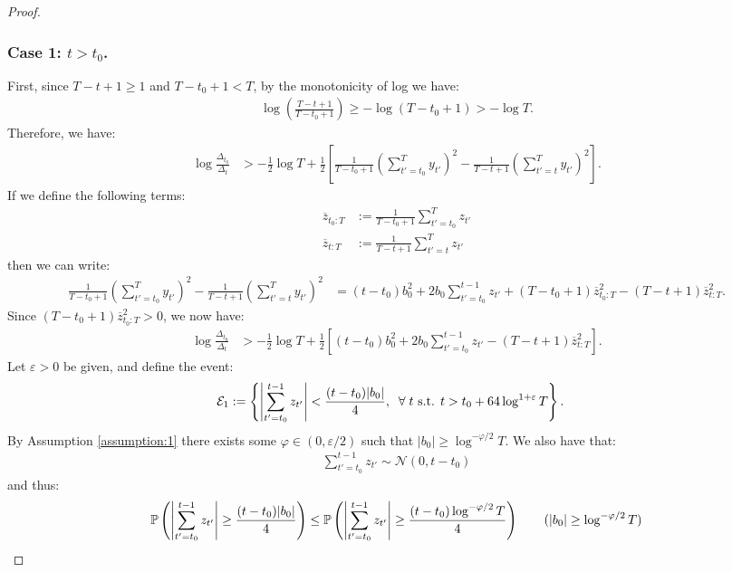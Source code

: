 \begin{proof}
\subsubsection*{Case 1: $t > t_0$.}

First, since $T-t +1\geq 1$ and $T-t_0+1 < T$, by the monotonicity of log we have: 
\begin{align*}
    \log \left(\frac{T-t+1}{T-t_0+1}\right) \geq -\log(T-t_0+1) > -\log T.
\end{align*}
Therefore, we have:
\begin{align*}
    \log \frac{\Delta_{t_0}}{\Delta_t} &> -\frac{1}{2} \log T + \frac{1}{2} \left[\frac{1}{T-t_0+1}\left(\sum_{t'=t_0}^{T} y_{t'}\right)^2- \frac{1}{T-t+1}\left(\sum_{t'=t}^{T} y_{t'}\right)^2\right]. 
\end{align*}
If we define the following terms:
\begin{align*}
    \overline{z}_{t_0:T} &:= \frac{1}{T-t_0+1}\sum_{t'=t_0}^T z_{t'} \\
    \overline{z}_{t:T} &:= \frac{1}{T-t+1}\sum_{t'=t}^T z_{t'}
\end{align*}
then we can write:
\small
\begin{align*}
    \frac{1}{T-t_0+1}\left(\sum_{t'=t_0}^{T} y_{t'}\right)^2- \frac{1}{T-t+1}\left(\sum_{t'=t}^{T} y_{t'}\right)^2 &= (t-t_0)b_0^2 + 2b_0\sum_{t'=t_0}^{t-1}z_{t'} + (T-t_0+1) \overline{z}^2_{t_0:T} - (T-t+1)\overline{z}^2_{t:T}.
\end{align*}
\normalsize
Since $(T-t_0+1) \overline{z}^2_{t_0:T} > 0$, we now have: 
\begin{align}
    \log \frac{\Delta_{t_0}}{\Delta_t} &> -\frac{1}{2} \log T + \frac{1}{2} \left[(t-t_0)b_0^2 + 2b_0\sum_{t'=t_0}^{t-1}z_{t'} - (T-t+1)\overline{z}^2_{t:T}\right].\label{eq:thm1-cs1-bd}
\end{align}
Let $\varepsilon > 0$ be given, and define the event: 
\begin{align*}
    \mathcal{E}_1 &:= \left\{\left|\sum_{t'=t_0}^{t-1} z_{t'}\right| < \frac{(t-t_0) |b_0|}{4}, \; \;\forall\; t \text{ s.t. } t > t_0 + 64 \log^{1+\varepsilon}T\right\}.
\end{align*}
By Assumption \ref{assumption:1} there exists some $\varphi \in (0,\varepsilon/2)$ such that $|b_0| \geq \log^{-\varphi/2}T$. We also have that:
\begin{align*}
    \sum_{t'=t_0}^{t-1} z_{t'} \sim \mathcal{N}(0,t-t_0)
\end{align*}
and thus: 
\begin{align}
    \mathbb{P}\left(\left|\sum_{t'=t_0}^{t-1} z_{t'}\right| \geq \frac{(t-t_0) |b_0|}{4}\right) &\leq \mathbb{P}\left(\left|\sum_{t'=t_0}^{t-1} z_{t'}\right| \geq \frac{(t-t_0) \log^{-\varphi/2}T}{4}\right) \tag{$|b_0| \geq \log^{-\varphi/2}T$} \\

\end{align}
\end{proof}
